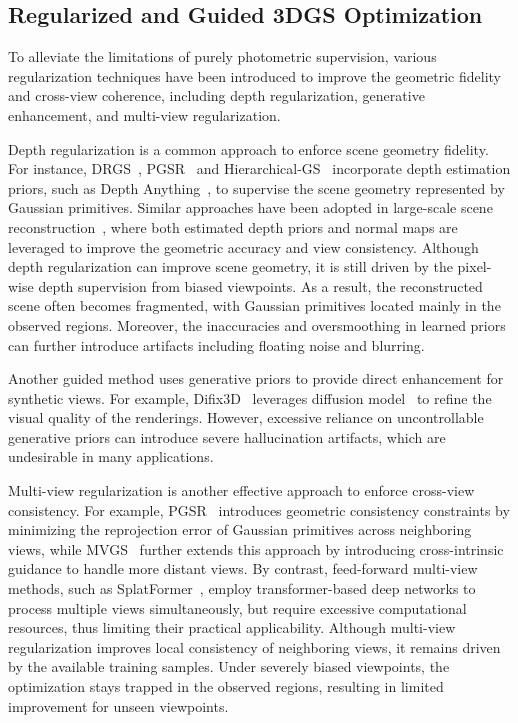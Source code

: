 \documentclass[lettersize,journal]{IEEEtran}
\begin{document}
\subsection{Regularized and Guided 3DGS Optimization}

To alleviate the limitations of purely photometric supervision, various regularization techniques have been introduced to improve the geometric fidelity and cross-view coherence, including depth regularization, generative enhancement, and multi-view regularization. 

Depth regularization is a common approach to enforce scene geometry fidelity. For instance, DRGS~\cite{drgs}, PGSR~\cite{pgsr} and Hierarchical-GS~\cite{hierarchical} incorporate depth estimation priors, such as Depth Anything~\cite{dav2}, to supervise the scene geometry represented by Gaussian primitives. Similar approaches have been adopted in large-scale scene reconstruction~\cite{hierarchical,citygaussian}, where both estimated depth priors and normal maps are leveraged to improve the geometric accuracy and view consistency. 
Although depth regularization can improve scene geometry, it is still driven by the pixel-wise depth supervision from biased viewpoints. As a result, the reconstructed scene often becomes fragmented, with Gaussian primitives located mainly in the observed regions. Moreover, the inaccuracies and oversmoothing in learned priors can further introduce artifacts including floating noise and blurring.

Another guided method uses generative priors to provide direct enhancement for synthetic views. For example, Difix3D~\cite{difix3d+} leverages diffusion model~\cite{diffusion} to refine the visual quality of the renderings. 
However, excessive reliance on uncontrollable generative priors can introduce severe hallucination artifacts, which are undesirable in many applications.

Multi-view regularization is another effective approach to enforce cross-view consistency. For example, 
PGSR~\cite{pgsr} introduces geometric consistency constraints by minimizing the reprojection error of Gaussian primitives across neighboring views, 
while MVGS~\cite{mvgs} further extends this approach by introducing cross-intrinsic guidance to handle more distant views. 
By contrast, feed-forward multi-view methods, such as SplatFormer~\cite{splatformer}, employ transformer-based deep networks to process multiple views simultaneously, but require excessive computational resources, thus limiting their practical applicability.
Although multi-view regularization improves local consistency of neighboring views, it remains driven by the available training samples. Under severely biased viewpoints, the optimization stays trapped in the observed regions, resulting in limited improvement for unseen viewpoints.
\end{document}
